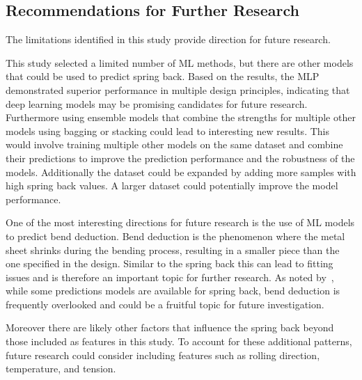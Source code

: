 \subsection{Recommendations for Further Research}\label{subsec:recommendations-for-further-research}
The limitations identified in this study provide direction for future research.

This study selected a limited number of \ac{ML} methods, but there are other models that could be used to
predict spring back.
Based on the results, the \ac{MLP} demonstrated superior performance in multiple design principles, indicating that
deep learning models may be promising candidates for future research.
Furthermore using ensemble models that combine the strengths for multiple other models using bagging or stacking could
lead to interesting new results.
This would involve training multiple other models on the same dataset and combine their predictions to improve the
prediction performance and the robustness of the models.
Additionally the dataset could be expanded by adding more samples with high spring back values.
A larger dataset could potentially improve the model performance.

One of the most interesting directions for future research is the use of \ac{ML} models to predict bend deduction.
Bend deduction is the phenomenon where the metal sheet shrinks during the bending process, resulting in a smaller
piece than the one specified in the design.
Similar to the spring back this can lead to fitting issues and is therefore an important topic for further research.
As noted by~\cite{strano2017fusion}, while some predictions models are available for spring back, bend deduction is
frequently overlooked and could be a fruitful topic for future investigation.

Moreover there are likely other factors that influence the spring back beyond those included as features in this study.
To account for these additional patterns, future research could consider including features such as rolling
direction, temperature, and tension.
